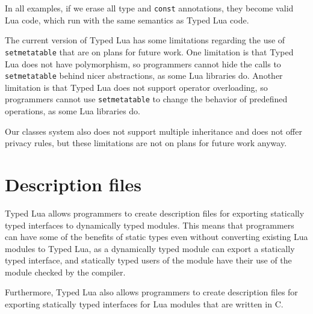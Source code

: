 In all examples, if we erase all type and \texttt{const} annotations,
they become valid Lua code, which run with the same semantics as Typed Lua code.

The current version of Typed Lua has some limitations regarding
the use of \texttt{setmetatable} that are on plans for future work.
One limitation is that Typed Lua does not have polymorphism,
so programmers cannot hide the calls to \texttt{setmetatable} behind
nicer abstractions, as some Lua libraries do.
Another limitation is that Typed Lua does not support operator overloading,
so programmers cannot use \texttt{setmetatable} to change the behavior
of predefined operations, as some Lua libraries do.

Our classes system also does not support multiple inheritance
and does not offer privacy rules, but these limitations are not
on plans for future work anyway.

\newpage
\section{Description files}
\label{sec:tld}

Typed Lua allows programmers to create description files
for exporting statically typed interfaces to dynamically typed modules.
This means that programmers can have some of the benefits of
static types even without converting existing Lua modules to Typed Lua,
as a dynamically typed module can export a statically typed interface,
and statically typed users of the module have their use of the module
checked by the compiler.

Furthermore, Typed Lua also allows programmers to create description
files for exporting statically typed interfaces for Lua modules
that are written in C.

